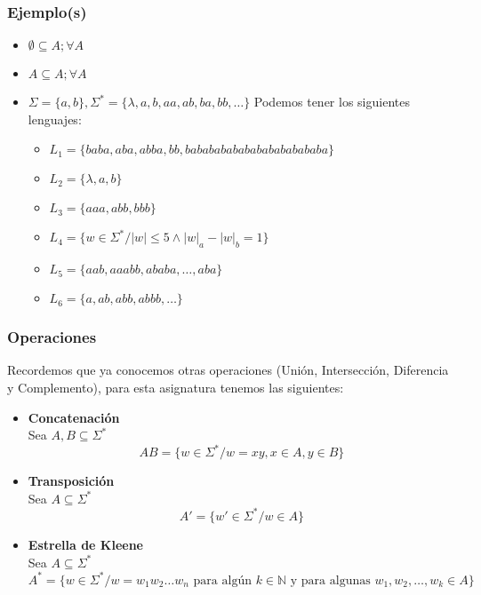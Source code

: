 \subsubsection{Ejemplo(s)}
\begin{itemize}
\item $\emptyset \subseteq A; \forall A$
\item $A \subseteq A; \forall A$
\item $\Sigma =\{ a,b \} , \Sigma^*= \{ \lambda, a,b,aa,ab,ba,bb,\ldots \}$
Podemos tener los siguientes lenguajes:
\begin{itemize}
\item $L_1 = \{ baba,aba,abba,bb,babababababababababababa\}$
\item $L_2 = \{ \lambda,a,b \}$
\item $L_3 = \{ aaa,abb,bbb \}$
\item $L_4 = \{ w\in\Sigma^* / |w|\leq 5 \wedge |w|_a - |w|_b = 1 \} $
\item $L_5 = \{ aab, aaabb,ababa,\ldots,aba \}$
\item $L_6 = \{ a,ab,abb,abbb,\ldots\}$
\end{itemize}
\end{itemize}
\subsubsection{Operaciones}
Recordemos que ya conocemos otras operaciones (Unión, Intersección, Diferencia y Complemento), para esta asignatura tenemos las siguientes:
\begin{itemize}
\item \textbf{Concatenación} \\ ${ }$ \\
Sea $A,B \subseteq \Sigma^*$ \\
$$AB =\{ w\in\Sigma^* / w=xy, x\in A, y\in B \}$$
\item \textbf{Transposición} \\ ${ }$ \\
Sea $A\subseteq \Sigma^*$ \\
$$A'=\{ w'\in \Sigma^* /w\in A\} $$
\item \textbf{Estrella de Kleene} \\ ${ }$ \\
Sea $A\subseteq \Sigma^*$ \\
$$A^* = \{w\in\Sigma^* / w=w_1 w_2 \ldots w_n \text{ para algún } k\in\mathbb{N} \text{ y para algunas }w_1,w_2,\ldots,w_k \in A\}$$
\end{itemize}
